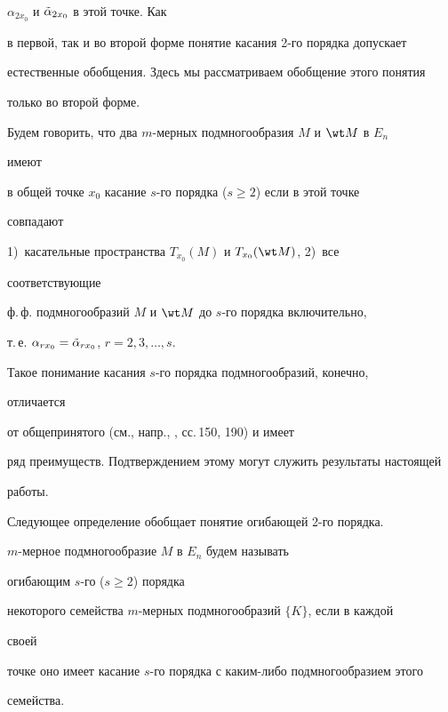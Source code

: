 $\alpha_{2x_0}$ и $\Tilde\alpha_{2x_0}$ в этой точке. Как 


в первой, так и во второй форме понятие касания 2-го порядка допускает 


естественные обобщения. Здесь мы рассматриваем обобщение этого понятия 


только во второй форме. 


 


Будем говорить, что два $m$-мерных подмногообразия $M$ и $\wt M$ в $E_n$ 


имеют 


в общей точке $x_0$ касание $s$-го порядка ($s\ge 2$) если в этой точке 


совпадают 


1)~касательные пространства $T_{x_0}(M)$ и $T_{x_0}(\wt M)$, 2)~все 


соответствующие 


ф.\,ф. подмногообразий $M$ и $\wt M$ до $s$-го порядка включительно, 


т.\,е. $\alpha_{rx_0}=\Tilde\alpha_{rx_0}$, $r=2,3,\dotsc,s$. 


 


Такое понимание касания $s$-го порядка подмногообразий, конечно, 


отличается 


от общепринятого (см., напр., \cite{Alek}, сс.\,150, 190) и имеет 


ряд преимуществ. Подтверждением этому могут служить результаты настоящей 


работы. 


 


Следующее определение обобщает понятие огибающей 2-го порядка. 


 


\begin{defnnonum} $m$-мерное подмногообразие $M$ в $E_n$ будем называть 


огибающим $s$-го ($s\ge 2$) порядка 


некоторого семейства $m$-мерных подмногообразий $\{K\}$, если в каждой 


своей 


точке оно имеет касание $s$-го порядка с каким-либо подмногообразием этого 


семейства. 


\end{defnnonum}


